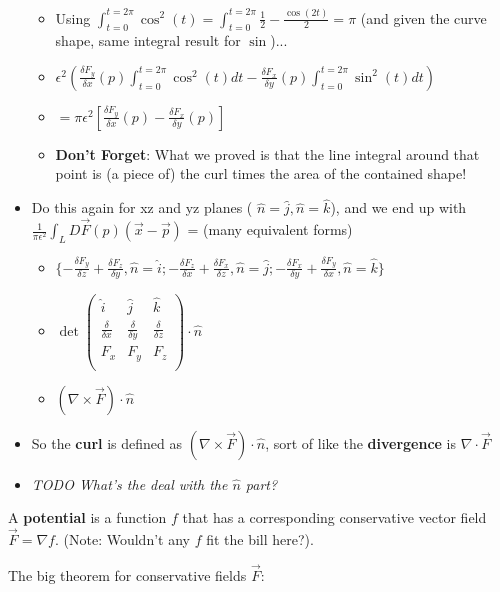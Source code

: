 \documentclass[11pt, oneside]{article}   	%
\begin{document}
\begin{itemize}
\begin{itemize}
\item Using $\int_{t=0}^{t=2\pi} \cos^2(t) = \int_{t=0}^{t=2\pi} \frac{1}{2} - \frac{\cos(2t)}{2} = \pi$ (and given the curve shape, same integral result for $\sin$)...
\item $\epsilon^2(\frac{\delta F_y}{\delta x}(p) \int_{t=0}^{t=2\pi} \cos^2(t)dt - \frac{\delta F_x}{\delta y}(p)\int_{t=0}^{t=2\pi} \sin^2(t)dt )$
\item $=\pi\epsilon^2[\frac{\delta F_y}{\delta x}(p) - \frac{\delta F_x}{\delta y}(p)]$
\item \textbf{Don't Forget}: What we proved is that the line integral around that point is (a piece of) the curl times the area of the contained shape!
\end{itemize}
\item Do this again for xz and yz planes ( $\hat{n} = \hat{j}, \hat{n} = \hat{k}$), and we end up with $\frac{1}{\pi\epsilon^2}\int_L D\vec{F}(p)(\vec{x} - \vec{p})$ = (many equivalent forms)
\begin{itemize}
\item $\{-\frac{\delta F_y}{\delta z} + \frac{\delta F_z}{\delta y}, \hat{n} = \hat{i}; -\frac{\delta F_z}{\delta x} + \frac{\delta F_x}{\delta z}, \hat{n} = \hat{j}; -\frac{\delta F_x}{\delta y} + \frac{\delta F_y}{\delta x}, \hat{n} = \hat{k}\}$
\item $\det\begin{pmatrix}
\hat{i} &\hat{j} &\hat{k}  \\
\frac{\delta}{\delta x} &\frac{\delta}{\delta y} &\frac{\delta}{\delta z}  \\
F_x & F_y & F_z \\
\end{pmatrix} \cdot \hat{n}$
\item $(\nabla \times \vec{F}) \cdot \hat{n}$
\end{itemize}
\item So the \textbf{curl} is defined as  $(\nabla \times \vec{F}) \cdot \hat{n}$, sort of like the \textbf{divergence} is $\nabla \cdot \vec{F}$
\item \emph{TODO What's the deal with the $\hat {n}$ part?}
\end{itemize}

A \textbf{potential} is a function $f$ that has a corresponding conservative vector field $\vec{F} = \nabla f$.   (Note: Wouldn't any $f$ fit the bill here?).

The big theorem for conservative fields $\vec{F}$: 
\end{document}

